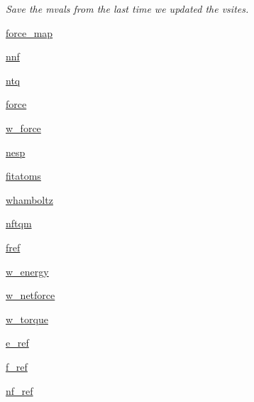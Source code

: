 \begin{DoxyCompactItemize}
\begin{DoxyCompactList}\small\item\em Save the mvals from the last time we updated the vsites. \end{DoxyCompactList}\item 
\hyperlink{classforcebalance_1_1abinitio_1_1AbInitio_a6558ea4f56053b0f539f987481c57a75}{force\-\_\-map}
\item 
\hyperlink{classforcebalance_1_1abinitio_1_1AbInitio_ac4a5765bf5b089176518f47004fcdb39}{nnf}
\item 
\hyperlink{classforcebalance_1_1abinitio_1_1AbInitio_af8a895f61ddea6b9ca2765ddbf309a75}{ntq}
\item 
\hyperlink{classforcebalance_1_1abinitio_1_1AbInitio_ab483592ce22356d09b52eb594f2f4b8e}{force}
\item 
\hyperlink{classforcebalance_1_1abinitio_1_1AbInitio_a4ec4863edbb6ea4a28777de905d621d3}{w\-\_\-force}
\item 
\hyperlink{classforcebalance_1_1abinitio_1_1AbInitio_ac258ad6180275ba2ffe5f68d1217e4ac}{nesp}
\item 
\hyperlink{classforcebalance_1_1abinitio_1_1AbInitio_a8b12ea0418108cc6c7693d75cc00227f}{fitatoms}
\item 
\hyperlink{classforcebalance_1_1abinitio_1_1AbInitio_a8f70f017ca8ec54c1acdbc85eff06ab9}{whamboltz}
\item 
\hyperlink{classforcebalance_1_1abinitio_1_1AbInitio_a64ae24d7e979723e65358e227b132a4a}{nftqm}
\item 
\hyperlink{classforcebalance_1_1abinitio_1_1AbInitio_ac974dfef45b416947dd21876443d808a}{fref}
\item 
\hyperlink{classforcebalance_1_1abinitio_1_1AbInitio_aa7f09e2ffc1253844c9f0736caf9b9e5}{w\-\_\-energy}
\item 
\hyperlink{classforcebalance_1_1abinitio_1_1AbInitio_af7cbfd50ca6a0b408c417e8d3bdb7cf3}{w\-\_\-netforce}
\item 
\hyperlink{classforcebalance_1_1abinitio_1_1AbInitio_a67643b98cce62c06c95f085d3a3e9722}{w\-\_\-torque}
\item 
\hyperlink{classforcebalance_1_1abinitio_1_1AbInitio_a71d13d3fabd98146c68bb5fc784f6732}{e\-\_\-ref}
\item 
\hyperlink{classforcebalance_1_1abinitio_1_1AbInitio_a6631ee11ee5646d97ea0fa5c9b22fc6a}{f\-\_\-ref}
\item 
\hyperlink{classforcebalance_1_1abinitio_1_1AbInitio_a5a77f4b99a5b01245ab0435d632122a1}{nf\-\_\-ref}
\item 

\end{DoxyCompactItemize}
